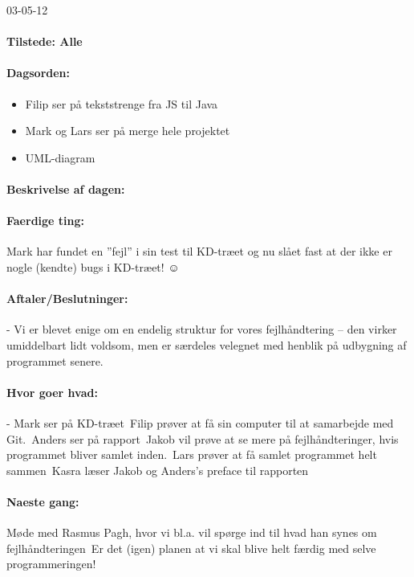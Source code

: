 \documentclass[a4paper,10pt,titlepage]{article}
\begin{document}
\begin{center}
		03-05-12
		\end{center}
		
		\paragraph{Tilstede: Alle}
		\paragraph{Dagsorden:}
		\begin{itemize}
					\item Filip ser på tekststrenge fra JS til Java
					\item Mark og Lars ser på merge hele projektet
					\item UML-diagram
		\end{itemize}
		
		\paragraph{Beskrivelse af dagen:}
		
		\paragraph{Faerdige ting:}
		Mark har fundet en ”fejl” i sin test til KD-træet og nu slået fast at der ikke er nogle (kendte) bugs i KD-træet! ☺ 
		\paragraph{Aftaler/Beslutninger:}
		-	Vi er blevet enige om en endelig struktur for vores fejlhåndtering – den virker umiddelbart lidt voldsom, men er særdeles velegnet med henblik på udbygning af programmet senere.
		\paragraph{Hvor goer hvad:}
		-	Mark ser på KD-træet\
Filip prøver at få sin computer til at samarbejde med Git.\
Anders ser på rapport\
Jakob vil prøve at se mere på fejlhåndteringer, hvis programmet bliver samlet inden.\
Lars prøver at få samlet programmet helt sammen\
Kasra læser Jakob og Anders’s preface til rapporten

		\paragraph{Naeste gang:}
		Møde med Rasmus Pagh, hvor vi bl.a. vil spørge ind til hvad han synes om fejlhåndteringen\
Er det (igen) planen at vi skal blive helt færdig med selve programmeringen!\mbox{}\\
\end{document}
